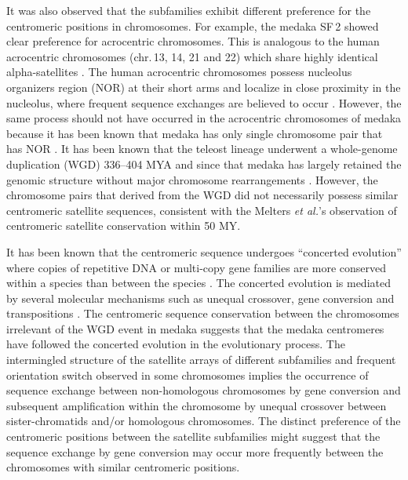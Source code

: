 It was also observed that the subfamilies exhibit different preference for the centromeric positions in chromosomes. For example, the medaka SF\,2 showed clear preference for acrocentric chromosomes. This is analogous to the human acrocentric chromosomes (chr.\,13, 14, 21 and 22) which share highly identical alpha-satellites \cite{Willard1991}. The human acrocentric chromosomes possess nucleolus organizers region (NOR) at their short arms and localize in close proximity in the nucleolus, where frequent sequence exchanges are believed to occur \cite{Willard1991}. However, the same process should not have occurred in the acrocentric chromosomes of medaka because it has been known that medaka has only single chromosome pair that has NOR \cite{Uwa1990}. It has been known that the teleost lineage underwent a whole-genome duplication (WGD) 336--404 MYA and since that medaka has largely retained the genomic structure without major chromosome rearrangements \cite{Kasahara2007}. However, the chromosome pairs that derived from the WGD did not necessarily possess similar centromeric satellite sequences, consistent with the Melters \textit{et al.}'s observation of centromeric satellite conservation within 50 MY.

It has been known that the centromeric sequence undergoes ``concerted evolution'' where copies of repetitive DNA or multi-copy gene families are more conserved within a species than between the species \cite{Dover1982, Willard1991, Charlesworth1994}. The concerted evolution is mediated by several molecular mechanisms such as unequal crossover, gene conversion and transpositions \cite{Dover1982}. The centromeric sequence conservation between the chromosomes irrelevant of the WGD event in medaka suggests that the medaka centromeres have followed the concerted evolution in the evolutionary process. The intermingled structure of the satellite arrays of different subfamilies and frequent orientation switch observed in some chromosomes implies the occurrence of sequence exchange between non-homologous chromosomes by gene conversion and subsequent amplification within the chromosome by unequal crossover between sister-chromatids and/or homologous chromosomes. The distinct preference of the centromeric positions between the satellite subfamilies might suggest that the sequence exchange by gene conversion may occur more frequently between the chromosomes with similar centromeric positions.

